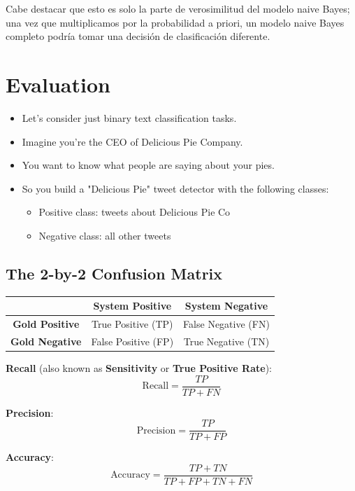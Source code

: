 Cabe destacar que esto es solo la parte de verosimilitud del modelo naive Bayes; una vez que multiplicamos por la probabilidad a priori, un modelo naive Bayes completo podría tomar una decisión de clasificación diferente.





\section{Evaluation}

\begin{itemize}
 \item Let's consider just binary text classification tasks. 
 \item Imagine you're the CEO of Delicious Pie Company. 
\item You want to know what people are saying about your pies. 
\item So you build a "Delicious Pie" tweet detector with the following classes:
\begin{itemize}
\item Positive class: tweets about Delicious Pie Co
\item Negative class: all other tweets
\end{itemize}
\end{itemize}



\subsection{The 2-by-2 Confusion Matrix}
\begin{table}[h]
\centering
\begin{tabular}{|c|c|c|}
\hline
\textbf{} & \textbf{System Positive} & \textbf{System Negative} \\
\hline
\textbf{Gold Positive} & True Positive (TP) & False Negative (FN) \\
\hline
\textbf{Gold Negative} & False Positive (FP) & True Negative (TN) \\
\hline
\end{tabular}
\end{table}

\textbf{Recall} (also known as \textbf{Sensitivity} or \textbf{True Positive Rate}):
\[ \text{Recall} = \frac{TP}{TP + FN} \]

\textbf{Precision}:
\[ \text{Precision} = \frac{TP}{TP + FP} \]

\textbf{Accuracy}:
\[ \text{Accuracy} = \frac{TP + TN}{TP + FP + TN + FN} \]


